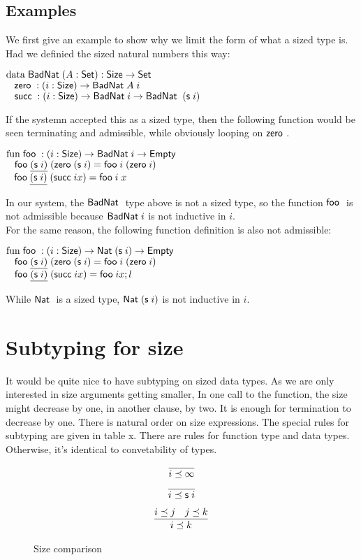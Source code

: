 \subsection{Examples}
We first give an example to show why we limit the form of what a sized type is.
Had we definied the sized natural numbers this way:
\begin{bsp}
$\mathrm{data}\; \mathsf{BadNat}\; ( A : \mathsf{Set} ) : \mathsf{Size} \rightarrow \mathsf{Set} $ \\
$\hspace*{3mm} \mathsf{zero}\; : ( i : \mathsf{Size} ) \rightarrow{ \mathsf{BadNat}\;A \; i} $\\
$\hspace*{3mm} \mathsf{succ}\; : ( i : \mathsf{Size} ) \rightarrow{\mathsf{BadNat}\;i \rightarrow\mathsf{BadNat}\;\; (\mathsf{s}\;i)} $
\end{bsp}
If the systemn accepted this as a sized type, then the following function would be seen terminating and admissible, while obviously looping on $\mathsf{zero}\;$.
\begin{bsp}
$\mathrm{fun}\; \mathsf{foo}\; : ( i : \mathsf{Size} ) \rightarrow{\mathsf{BadNat}\;i \rightarrow\mathsf{Empty}\;}$\\
$\hspace*{3mm} \mathsf{foo}\; \underline{(\mathsf{s}\; i)} \; (\mathsf{zero}\; (\mathsf{s}\; i) = \mathsf{foo}\; i \; (\mathsf{zero}\; i)$\\
$\hspace*{3mm} \mathsf{foo}\; \underline{(\mathsf{s}\; i)}\; (\mathsf{succ}\; i x) = \mathsf{foo}\; i \; x$
\end{bsp}
In our system, the $\mathsf{BadNat}\;$ type above is not a sized type, so the function $\mathsf{foo}\;$ is not admissible because $\mathsf{BadNat}\; i$ is not inductive in $i$.\\
For the same reason, the following function definition is also not admissible:
\begin{bsp}
$\mathrm{fun}\; \mathsf{foo}\; : ( i : \mathsf{Size} ) \rightarrow{\mathsf{Nat}\;(\mathsf{s}\;i) \rightarrow\mathsf{Empty}\;}$\\
$\hspace*{3mm} \mathsf{foo}\; \underline{(\mathsf{s}\; i)} \; (\mathsf{zero}\; (\mathsf{s}\; i) = \mathsf{foo}\; i \; (\mathsf{zero}\; i)$\\
$\hspace*{3mm} \mathsf{foo}\; \underline{(\mathsf{s}\; i)}\; (\mathsf{succ}\; i x) = \mathsf{foo}\; i x; l$
\end{bsp}
While $\mathsf{Nat}\;$ is a sized type, $\mathsf{Nat}\; (\mathsf{s}\; i)$ is not inductive in $i$.
\section{Subtyping for size}
It would be quite nice to have subtyping on sized data types.
As we are only interested in size arguments getting smaller, 
In one call to the function, the size might decrease by one, in another clause, by two.
It is enough for termination to decrease by one.
There is natural order on size expressions.
The special rules for subtyping are given in table x.
There are rules for function type and data types.
Otherwise, it's identical to convetability of types.  
\begin{figure}[p]
\[
\begin{array}{c}
	  \infer{i \preceq \infty}
          {}
\end{array}
\]
\[
\begin{array}{c}
	  \infer{i \preceq \s i}
          {}
\end{array}
\]
\[
\begin{array}{c}
	  \infer{i \preceq k}
          {i \preceq j & j \preceq k}
\end{array}
\]
\caption{Size comparison}
\end{figure}



